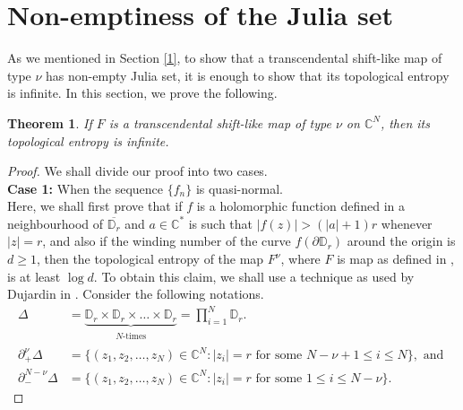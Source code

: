 \documentclass[12pt, reqno]{amsart}
\numberwithin{equation}{section}
\theoremstyle{definition}
\theoremstyle{remark}
\theoremstyle{plain}
\newtheorem{theorem}{Theorem}[section]
\theoremstyle{definition}
\numberwithin{equation}{section}
\begin{document}
\section{Non-emptiness of the Julia set }
As we mentioned in Section \ref{1}, to show that a transcendental shift-like map of type $\nu$ has non-empty Julia set, it is enough to show that its topological entropy is infinite. In this section, we prove the following.
\begin{theorem}
If $F$ is a transcendental shift-like map of type $\nu$ on $\mathbb{C}^N$, then its topological entropy is infinite.
\end{theorem}
\begin{proof}
We shall divide our proof into two cases.\\
\textbf{Case 1:} When the sequence $\{f_n\}$ is quasi-normal. \\
Here, we shall first prove that if $f$ is a holomorphic  function defined in a neighbourhood of $\overline{\mathbb{D}_r}$ and $a\in\mathbb{C}^*$ is  such that $|f(z)|>(|a|+1)r$ whenever $|z|=r$, and also if the winding number of the curve $f(\partial\mathbb{D}_r)$ around the origin is $d\geq 1$, then the topological entropy of the map $F^{\nu}$, where $F$ is map as defined in , is at least $\log d.$
To obtain this claim, we shall use a technique as used by Dujardin in \cite[Theorem 3.1]{Dujardin}. Consider the following notations.
\begin{align*}
\Delta&=\underbrace{\mathbb{D}_r\times\mathbb{D}_r\times\dots\times\mathbb{D}_r}_{\substack{N\text{-times}}}=\prod_{i=1}^N \mathbb{D}_r.\\
\partial^{\nu}_+\Delta &=\{(z_1,z_2,\dots,z_N)\in\mathbb{C}^N: |z_i|=r \text{ for some } N-\nu+1\leq i\leq 	N\}, \text{ and } \\
\partial^{N-\nu}_-\Delta&=\{(z_1,z_2,\dots,z_N)\in\mathbb{C}^N: |z_i|=r \text{ for some } 1\leq i\leq 	N-\nu\}.
\end{align*}


\end{proof}
\end{document}
